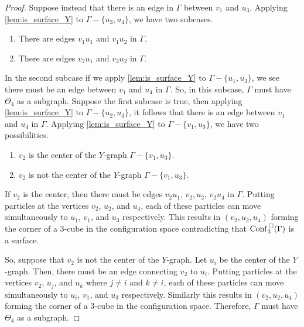 \begin{proof}
    Suppose instead that there is an edge in \(\Gamma\) between \(v_1\) and \(u_3\).
    Applying \ref{lem:is_surface_Y} to \(\Gamma - \{u_3, u_4\}\),
    we have two subcases.
    \begin{enumerate}
        \item There are edges \(v_1 u_1\) and \(v_1 u_2\) in \(\Gamma\).
        \item There are edges \(v_2 u_1\) and \(v_2 u_2\) in \(\Gamma\).
    \end{enumerate}
    In the second subcase if we apply \ref{lem:is_surface_Y} to \(\Gamma - \{u_1, u_3\}\),
    we see there must be an edge between \(v_1\) and \(u_4\) in \(\Gamma\).
    So, in this subcase, \(\Gamma\) must have \(\Theta_4\) as a subgraph.
    Suppose the first subcase is true, then applying \ref{lem:is_surface_Y} to \(\Gamma - \{u_2, u_3\}\),
    it follows that there is an edge between \(v_1\) and \(u_4\) in \(\Gamma\).
    Applying \ref{lem:is_surface_Y} to \(\Gamma - \{v_1, u_3\}\),
    we have two possibilities.
    \begin{enumerate}
        \item \(v_2\) is the center of the \(Y\)-graph \(\Gamma - \{v_1, u_3\}\).
        \item \(v_2\) is not the center of the \(Y\)-graph \(\Gamma - \{v_1, u_3\}\).
    \end{enumerate}
    If \(v_2\) is the center, then there must be edges \(v_2 u_1\), \(v_2, u_2\), \(v_2 u_4\) in \(\Gamma\).
    Putting particles at the vertices \(v_2\), \(u_2\), and \(u_4\), each of these particles can move
    simultaneously to \(u_1\), \(v_1\), and \(u_3\) respectively.
    This results in \((v_2, u_2, u_4)\) forming the corner of a \(3\)-cube in the configuration space
    contradicting that \(\mathrm{Conf}^{\,\square}_3(\Gamma)\) is a surface.

    So, suppose that \(v_2\) is not the center of the \(Y\)-graph. Let \(u_i\) be the center of the \(Y\)-graph.
    Then, there must be an edge connecting \(v_2\) to \(u_i\).
    Putting particles at the vertices \(v_2\), \(u_j\), and \(u_k\) where \(j \neq i\) and \(k \neq i\),
    each of these particles can move simultaneously to \(u_i\), \(v_1\), and \(u_3\) respectively.
    Similarly this results in \((v_2, u_2, u_4)\) forming the corner of a \(3\)-cube in the configuration space.
    Therefore, \(\Gamma\) must have \(\Theta_4\) as a subgraph.


\end{proof}
